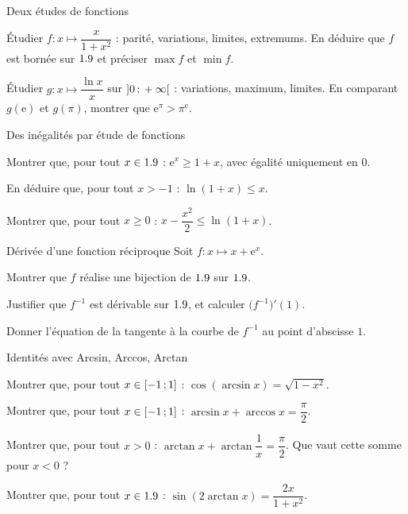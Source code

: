 
\begin{exercice}[2]{Deux études de fonctions}
\begin{questions}
  \item Étudier $f:x\mapsto\dfrac{x}{1+x^{2}}$ : parité, variations, limites,
    extremums. En déduire que $f$ est bornée sur $1.9$ et préciser
    $\max f$ et $\min f$.
  \item Étudier $g:x\mapsto\dfrac{\ln x}{x}$ sur $\mathopen{]}0\,{;}\,+\infty\mathclose{[}$ :
    variations, maximum, limites. En comparant $g(\mathrm{e})$ et $g(\pi)$,
    montrer que $\mathrm{e}^{\pi}>\pi^{\mathrm{e}}$.
\end{questions}
\end{exercice}

\begin{exercice}[2]{Des inégalités par étude de fonctions}
\begin{questions}
  \item Montrer que, pour tout $x\in1.9$ : $\mathrm{e}^{x}\geq1+x$, avec égalité
    uniquement en $0$.
  \item En déduire que, pour tout $x>-1$ : $\ln(1+x)\leq x$.
  \item Montrer que, pour tout $x\geq0$ :
    $x-\dfrac{x^{2}}{2}\leq\ln(1+x)$.
\end{questions}
\end{exercice}

\begin{exercice}[2]{Dérivée d'une fonction réciproque}
Soit $f:x\mapsto x+\mathrm{e}^{x}$.
\begin{questions}
  \item Montrer que $f$ réalise une bijection de $1.9$ sur $1.9$.
  \item Justifier que $f^{-1}$ est dérivable sur $1.9$, et calculer
    $\bigl(f^{-1}\bigr)'(1)$.
  \item Donner l'équation de la tangente à la courbe de $f^{-1}$ au point
    d'abscisse $1$.
\end{questions}
\end{exercice}

\begin{exercice}[2]{Identités avec Arcsin, Arccos, Arctan}
\begin{questions}
  \item Montrer que, pour tout $x\in\mathopen{[}-1\,{;}\,1\mathclose{]}$ :
    $\cos(\arcsin x)=\sqrt{1-x^{2}}$.
  \item Montrer que, pour tout $x\in\mathopen{[}-1\,{;}\,1\mathclose{]}$ :
    $\arcsin x+\arccos x=\dfrac{\pi}{2}$.
  \item Montrer que, pour tout $x>0$ :
    $\arctan x+\arctan\dfrac1x=\dfrac{\pi}{2}$. Que vaut cette somme pour
    $x<0$ ?
  \item Montrer que, pour tout $x\in1.9$ :
    $\sin(2\arctan x)=\dfrac{2x}{1+x^{2}}$.
\end{questions}
\end{exercice}

